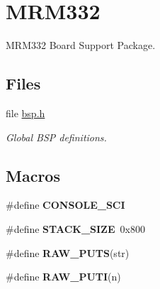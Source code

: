 \hypertarget{group__RTEMSBSPsM68kMRM332}{}\section{M\+R\+M332}
\label{group__RTEMSBSPsM68kMRM332}


M\+R\+M332 Board Support Package.  


\subsection*{Files}
\begin{DoxyCompactItemize}
\item 
file \mbox{\hyperlink{bsps_2m68k_2mrm332_2include_2bsp_8h}{bsp.\+h}}
\begin{DoxyCompactList}\small\item\em Global B\+SP definitions. \end{DoxyCompactList}\end{DoxyCompactItemize}
\subsection*{Macros}
\begin{DoxyCompactItemize}
\item 
\mbox{\label{group__RTEMSBSPsM68kMRM332_ga9f9667175e7627b090131f70650b19fb}} 
\#define {\bfseries C\+O\+N\+S\+O\+L\+E\+\_\+\+S\+CI}
\item 
\mbox{\label{group__RTEMSBSPsM68kMRM332_ga6423a880df59733d2d9b509c7718d3a9}} 
\#define {\bfseries S\+T\+A\+C\+K\+\_\+\+S\+I\+ZE}~0x800
\item 
\#define {\bfseries R\+A\+W\+\_\+\+P\+U\+TS}(str)
\item 
\#define {\bfseries R\+A\+W\+\_\+\+P\+U\+TI}(n)
\end{DoxyCompactItemize}
